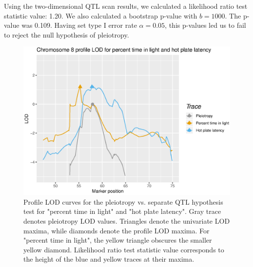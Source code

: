 \documentclass[12pt,twoside, lineno]{gsajnl}
\begin{document}
Using the two-dimensional QTL scan results, we calculated a likelihood ratio test statistic value: 1.20. We also calculated a bootstrap p-value with $b = 1000$. The p-value was 0.109. Having set type I error rate $\alpha = 0.05$, this p-values led us to fail to reject the null hypothesis of pleiotropy.


\begin{figure}
\includegraphics[width = \textwidth]{../Rmd/profile.eps}
\caption{Profile LOD curves for the pleiotropy vs. separate QTL hypothesis test for "percent time in light" and "hot plate latency". Gray trace denotes pleiotropy LOD values. Triangles denote the univariate LOD maxima, while diamonds denote the profile LOD maxima. For "percent time in light", the yellow triangle obscures the smaller yellow diamond. Likelihood ratio test statistic value corresponds to the height of the blue and yellow traces at their maxima.}
\label{fig:profiles}
\end{figure}







\end{document}

